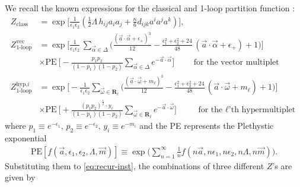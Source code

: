 \documentclass[letterpaper, 11pt]{article}
\newcommand{\nn}{\nonumber}
\def\a{\alpha}
\def\e{\epsilon}
\def\w{\omega}
\def\D{\Delta}
\begin{document}
We recall the known expressions for the classical and 1-loop partition function \cite{Intriligator:1997pq,Nekrasov:2002qd,Shadchin:2005mx}:
\begin{align}
   { Z_{\textrm{class}}} &= \exp \Bigg[\frac{1}{\epsilon_1\epsilon_2}\left(\frac{1}{2}\Lambda \, h_{ij}a_i a_j +\frac{\kappa}{6}d_{ijk} a^{i}a^j a^k\right) \Bigg],\\
   \label{eq:1-loop-vec}
   { Z_{\textrm{1-loop}}^\text{vec}} &= \exp \Bigg[\frac{1}{\epsilon_1\epsilon_2} \,  \sum_{\vec{\alpha}\in\Delta}\Big(\frac{(\vec{a}\cdot\vec{\alpha}+\e_+)^3}{12}-\frac{\e_1^2+\e_2^2+24}{48}\,(\vec{a}\cdot\vec{\alpha}+\e_+)+1\Big)\Bigg]\nn\\ & \times \text{PE}\ \Bigg[- \frac{p_1 p_2}{(1-p_1)(1-p_2) }\sum_{\vec{\a} \in \D} e^{- \vec{a} \cdot \vec{\a}}  \Bigg]  \qquad \text{ for the vector multiplet}\\
   \label{eq:1-loop-hyp}
   { Z_{\textrm{1-loop}}^\text{hyp,$i$}} &= \exp \Bigg[-\frac{1}{\epsilon_1\epsilon_2} \sum_{\vec{\omega}\in\boldsymbol{R}_\ell}\Big(\frac{(\vec{a}\cdot\vec{\omega}+m_\ell)^3}{12}-\frac{\e_1^2+\e_2^2+24}{48}\,(\vec{a}\cdot\vec{\omega}+m_\ell)+1\Big)\Bigg]\nn\\ &
   \times \text{PE}\ \Bigg[+ \frac{(p_1 p_2)^{\frac{1}{2}} \cdot  y_\ell } {(1-p_1)(1-p_2) }\sum_{\vec{\omega}\in\boldsymbol{R}_\ell}e^{-\vec{a} \cdot \vec{\w}}\Bigg] \qquad \text{ for the $\ell$'th hypermultiplet}
\end{align}
where $p_1 \equiv e^{-\e_1},\, p_2 \equiv e^{-\e_2},\, y_i \equiv e^{-m_{i}}$ and the PE represents the Plethystic exponential
\begin{align}
  \textstyle\text{PE}\left[f(\vec{a},\e_1,\e_2,\Lambda,\vec{m})\right] \equiv \exp\Big(\sum_{n=1}^\infty\frac{1}{n} f(n\vec{a},n\e_1,n\e_2,n\Lambda,n\vec{m})\Big).
\end{align}
Substituting them to \eqref{eq:recur-inst}, the combinations of three different $Z$'s are given by
\end{document}
